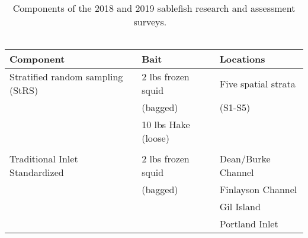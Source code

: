 \documentclass[12pt]{article}\usepackage[]{graphicx}\usepackage[]{color}
\begin{document}
\begin{table}[!h]

\caption{\label{tab:table2}Components of the 2018 and 2019 sablefish research and assessment surveys. ~\\
\hspace*{0.333em}\\}
\fontsize{8}{10}\selectfont
\begin{tabular}[t]{lll}
\toprule
Component & Bait & Locations\\
\midrule
Stratified random sampling (StRS) & 2 lbs frozen squid & Five spatial strata\\
 & (bagged) & (S1-S5)\\
 & 10 lbs Hake (loose) & \\
 &  & \\
\hline
Traditional Inlet Standardized & 2 lbs frozen squid & Dean/Burke Channel\\
 & (bagged) & Finlayson Channel\\
 &  & Gil Island\\
 &  & Portland Inlet\\
\bottomrule
\end{tabular}
\end{table}
\end{document}
